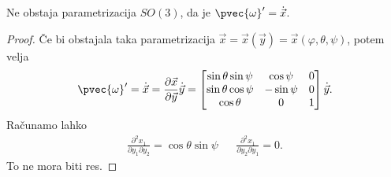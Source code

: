 
\begin{trditev}
  Ne obstaja parametrizacija $SO(3)$, da je $\pvec{\omega}' = \dot{\vec{x}}$.
\end{trditev}

\begin{proof}
  Če bi obstajala taka parametrizacija $\vec{x} = \vec{x}(\vec{y}) =
  \vec{x}(\varphi, \theta, \psi)$, potem velja
  \[
	\pvec{\omega}' = \dot{\vec{x}} = \frac{\partial \vec{x}}{\partial \vec{y}}
	\dot{\vec{y}} =
	\begin{bmatrix}
	  \sin \theta \sin \psi & \cos \psi & 0 \\
	  \sin \theta \cos \psi & - \sin \psi & 0 \\
	  \cos \theta & 0 & 1
	\end{bmatrix}
	\dot{\vec{y}}.
  \]
  Računamo lahko
  \begin{align*}
	\frac{\partial^2 x_1}{\partial y_1 \partial y_2} = \cos \theta \sin \psi
	&& \frac{\partial^2 x_1}{\partial y_2 \partial y_1} = 0.
  \end{align*}
  To ne mora biti res.
\end{proof}